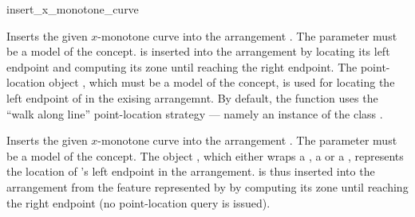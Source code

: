 \ccRefPageBegin

\begin{ccRefFunction}{insert_x_monotone_curve}

\ccDefinition

Inserts the given $x$-monotone curve  into the arrangement
. The  parameter must be a model of the
 concept.  is inserted
into the arrangement by locating its left endpoint and computing its
zone until reaching the right endpoint.
The point-location object , which must be a model of the
 concept, is used for locating the
left endpoint of  in the exising arrangemnt.
By default, the function uses the ``walk along line'' point-location
strategy --- namely an instance of the class
.



%

Inserts the given $x$-monotone curve  into the arrangement
. The  parameter must be a model of the
 concept. The object , which
either wraps a , a 
or a , represents the location of 's left
endpoint in the arrangement.  is thus inserted
into the arrangement from the feature represented by  by
computing its zone until reaching the right endpoint (no point-location
query is issued).


\end{ccRefFunction}

\ccRefPageEnd
